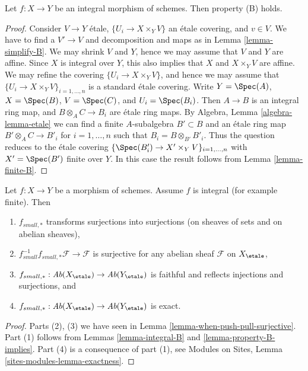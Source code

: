 \begin{lemma}
\label{lemma-integral-B}
Let $f : X \to Y$ be an integral morphism of schemes.
Then property (B) holds.
\end{lemma}

\begin{proof}
Consider $V \to Y$ \'etale, $\{U_i \to X \times_Y V\}$ an \'etale covering, and
$v \in V$. We have to find a $V' \to V$ and decomposition and maps as in
Lemma \ref{lemma-simplify-B}.
We may shrink $V$ and $Y$, hence we may assume that $V$ and $Y$ are affine.
Since $X$ is integral over $Y$, this also implies that $X$ and
$X \times_Y V$ are affine. We may refine the covering
$\{U_i \to X \times_Y V\}$, and hence we may assume that
$\{U_i \to X \times_Y V\}_{i = 1, \ldots, n}$ is a standard \'etale covering.
Write $Y = \Spec(A)$, $X = \Spec(B)$,
$V = \Spec(C)$, and $U_i = \Spec(B_i)$.
Then $A \to B$ is an integral ring map, and $B \otimes_A C \to B_i$ are
\'etale ring maps. By
Algebra, Lemma \ref{algebra-lemma-etale}
we can find a finite $A$-subalgebra $B' \subset B$ and an \'etale ring
map $B' \otimes_A C \to B'_i$ for $i = 1, \ldots, n$
such that $B_i = B \otimes_{B'} B'_i$. Thus the question
reduces to the \'etale covering
$\{\Spec(B'_i) \to X' \times_Y V\}_{i = 1, \ldots, n}$
with $X' = \Spec(B')$ finite over $Y$.
In this case the result follows from
Lemma \ref{lemma-finite-B}.
\end{proof}

\begin{lemma}
\label{lemma-what-integral}
Let $f : X \to Y$ be a morphism of schemes.
Assume $f$ is integral (for example finite).
Then
\begin{enumerate}
\item $f_{small, *}$ transforms surjections into surjections (on sheaves
of sets and on abelian sheaves),
\item $f_{small}^{-1}f_{small, *}\mathcal{F} \to \mathcal{F}$
is surjective for any abelian sheaf $\mathcal{F}$ on $X_\etale$,
\item
$f_{small, *} :
\textit{Ab}(X_\etale)
\to
\textit{Ab}(Y_\etale)$
is faithful and reflects injections and surjections, and
\item
$f_{small, *} :
\textit{Ab}(X_\etale)
\to
\textit{Ab}(Y_\etale)$
is exact.
\end{enumerate}
\end{lemma}

\begin{proof}
Parts (2), (3) we have seen in
Lemma \ref{lemma-when-push-pull-surjective}.
Part (1) follows from
Lemmas \ref{lemma-integral-B} and \ref{lemma-property-B-implies}.
Part (4) is a consequence of part (1), see
Modules on Sites, Lemma \ref{sites-modules-lemma-exactness}.
\end{proof}









